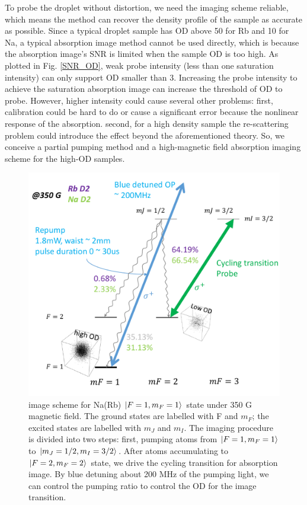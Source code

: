 To probe the droplet without distortion, we need the imaging scheme reliable, which means the method can recover the density profile of the sample as accurate as possible. Since a typical droplet sample has OD above 50 for Rb and 10 for Na, a typical absorption image method cannot be used directly, which is because the absorption image's SNR is limited when the sample OD is too high. As plotted in Fig. \ref{SNR_OD}, weak probe intensity (less than one saturation intensity) can only support OD smaller than 3. Increasing the probe intensity to achieve the saturation absorption image can increase the threshold of OD to probe. However, higher intensity could cause several other problems: first, calibration could be hard to do or cause a significant error because the nonlinear response of the absorption. second, for a high density sample the re-scattering problem could introduce the effect beyond the aforementioned theory. So, we conceive a partial pumping method and a high-magnetic field absorption imaging scheme for the high-OD samples.

\begin{figure}[htbp]
\begin{center}
\includegraphics[width = 0.8\linewidth]{figures/High-field image scheme.pdf}
\end{center}
\caption[image scheme for Na(Rb) $\ket{F=1,m_F=1}$ state under 350 G magnetic field]{image scheme for Na(Rb) $\ket{F=1,m_F=1}$ state under 350 G magnetic field. The ground states are labelled with F and $m_F$; the excited states are labelled with $m_J$ and $m_I$. The imaging procedure is divided into two steps: first, pumping atoms from $\ket{F=1,m_F=1}$ to $\ket{m_J=1/2,m_I=3/2}$. After atoms accumulating to $\ket{F=2,m_F=2}$ state, we drive the cycling transition for absorption image. By blue detuning about 200 MHz of the pumping light, we can control the pumping ratio to control the OD for the image transition.}
\label{High-field image sheme}
\end{figure}

